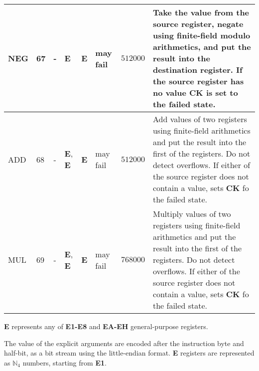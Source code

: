 \documentclass[9pt,oneside]{amsart}
\begin{document}
\begin{table}[h]
\begin{tabular}{l p{1cm} p{1.4cm} p{1cm} p{1cm} p{1.5cm} r p{6cm}}
NEG	&	67	&	-	&	\textbf{E}	&	\textbf{E}	&	may fail	&$512000$	&Take the value from the source register, negate using finite-field modulo arithmetics, and put the result into the destination register. If the source register has no value \textbf{CK} is set to the failed state.	\\ \midrule
ADD	&	68	&	-	&	\textbf{E}, \textbf{E}	&	\textbf{E}	&	may fail	&$512000$	&Add values of two registers using finite-field arithmetics and put the result into the first of the registers. Do not detect overflows. If either of the source register does not contain a value, sets \textbf{CK} fo the failed state.	\\ \midrule
MUL	&	69	&	-	&	\textbf{E}, \textbf{E}	&	\textbf{E}	&	may fail	&$768000$	&Multiply values of two registers using finite-field arithmetics and put the result into the first of the registers. Do not detect overflows. If either of the source register does not contain a value, sets \textbf{CK} fo the failed state.	\\
\bottomrule
\end{tabular}
\end{table}


\textbf{E} represents any of \textbf{E1-E8} and \textbf{EA-EH} general-purpose registers.

The value of the explicit arguments are encoded after the instruction byte and half-bit, as a bit stream
using the little-endian format.
\textbf{E} registers are represented as $\mathbb{N}_4$ numbers, starting from \textbf{E1}.

\newpage
\end{document}
